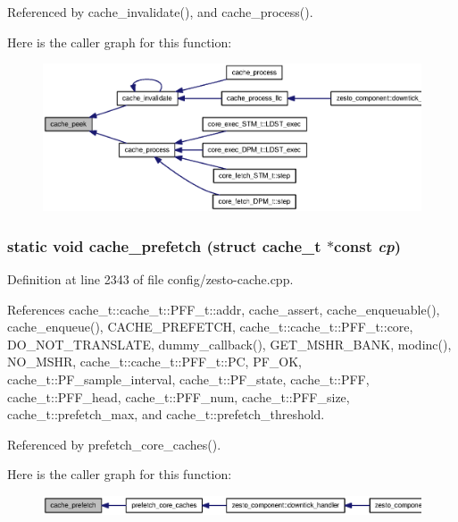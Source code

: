 Referenced by cache\_\-invalidate(), and cache\_\-process().

Here is the caller graph for this function:\nopagebreak
\begin{figure}[H]
\begin{center}
\leavevmode
\includegraphics[width=420pt]{config_2zesto-cache_8cpp_32083cc0a79d18fbb1932fca2d15df1e_icgraph}
\end{center}
\end{figure}
\subsubsection[{cache\_\-prefetch}]{\setlength{\rightskip}{0pt plus 5cm}static void cache\_\-prefetch (struct {\bf cache\_\-t} $\ast$const  {\em cp})\hspace{0.3cm}{\tt  [static]}}\label{config_2zesto-cache_8cpp_488a1ffa67f67839ee35d6925c2162d8}




Definition at line 2343 of file config/zesto-cache.cpp.

References cache\_\-t::cache\_\-t::PFF\_\-t::addr, cache\_\-assert, cache\_\-enqueuable(), cache\_\-enqueue(), CACHE\_\-PREFETCH, cache\_\-t::cache\_\-t::PFF\_\-t::core, DO\_\-NOT\_\-TRANSLATE, dummy\_\-callback(), GET\_\-MSHR\_\-BANK, modinc(), NO\_\-MSHR, cache\_\-t::cache\_\-t::PFF\_\-t::PC, PF\_\-OK, cache\_\-t::PF\_\-sample\_\-interval, cache\_\-t::PF\_\-state, cache\_\-t::PFF, cache\_\-t::PFF\_\-head, cache\_\-t::PFF\_\-num, cache\_\-t::PFF\_\-size, cache\_\-t::prefetch\_\-max, and cache\_\-t::prefetch\_\-threshold.

Referenced by prefetch\_\-core\_\-caches().

Here is the caller graph for this function:\nopagebreak
\begin{figure}[H]
\begin{center}
\leavevmode
\includegraphics[width=387pt]{config_2zesto-cache_8cpp_488a1ffa67f67839ee35d6925c2162d8_icgraph}
\end{center}
\end{figure}
